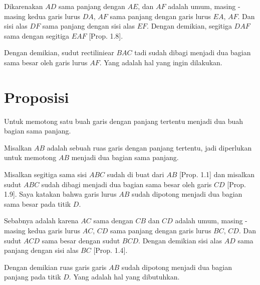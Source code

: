 \documentclass[a4paper]{book}
\begin{document}
Dikarenakan $AD$ sama panjang dengan $AE$, dan $AF$ adalah umum, masing - masing
kedua garis lurus $DA$, $AF$ sama panjang dengan garis lurus $EA$, $AF$. Dan 
sisi alas $DF$ sama panjang dengan sisi alas $EF$. Dengan demikian, segitiga
$DAF$ sama dengan segitiga $EAF$ [Prop. 1.8].

Dengan demikian, sudut rectiliniear $BAC$ tadi sudah dibagi menjadi dua bagian
sama besar oleh garis lurus $AF$. Yang adalah hal yang ingin dilakukan.

\section*{\centering Proposisi \thesection} 
Untuk memotong satu buah garis dengan panjang tertentu menjadi dua buah bagian 
sama panjang.

\begin{center}
\end{center}

Misalkan $AB$ adalah sebuah ruas garis dengan panjang tertentu, jadi diperlukan
untuk memotong $AB$ menjadi dua bagian sama panjang.

Misalkan segitiga sama sisi $ABC$ sudah di buat dari $AB$ [Prop. 1.1] dan
misalkan sudut $ABC$ sudah dibagi menjadi dua bagian sama besar oleh garis 
$CD$ [Prop. 1.9]. Saya katakan bahwa garis lurus $AB$ sudah dipotong menjadi
dua bagian sama besar pada titik $D$.

Sebabnya adalah karena $AC$ sama dengan $CB$ dan $CD$ adalah umum, masing - masing
kedua garis lurus $AC$, $CD$ sama panjang dengan garis lurus $BC$, $CD$. Dan 
sudut $ACD$ sama besar dengan sudut $BCD$. Dengan demikian sisi alas $AD$ sama
panjang dengan sisi alas $BC$ [Prop. 1.4].

Dengan demikian ruas garis garis $AB$ sudah dipotong menjadi dua bagian panjang
pada titik $D$. Yang adalah hal yang dibutuhkan.

\end{document}
